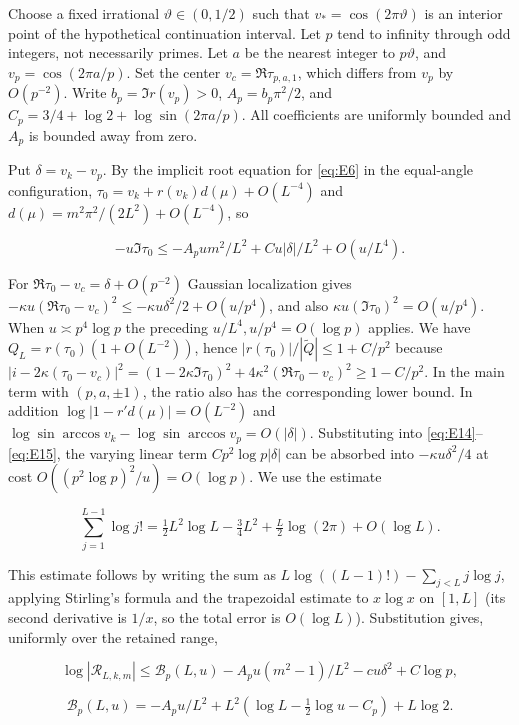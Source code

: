 \documentclass[11pt,a4paper]{article}
\numberwithin{equation}{section}
\theoremstyle{plain}
\theoremstyle{definition}
\begin{document}
Choose a fixed irrational \(\vartheta\in(0,1/2)\) such that \(v_*=\cos(2\pi\vartheta)\) is an interior point of the hypothetical continuation interval. Let \(p\) tend to infinity through odd integers, not necessarily primes. Let \(a\) be the nearest integer to \(p\vartheta\), and \(v_p=\cos(2\pi a/p)\). Set the center \(v_c=\Re\tau_{p,a,1}\), which differs from \(v_p\) by \(O(p^{-2})\). Write \(b_p=\Im r(v_p)>0\), \(A_p=b_p\pi^2/2\), and \(C_p=3/4+\log2+\log\sin(2\pi a/p)\). All coefficients are uniformly bounded and \(A_p\) is bounded away from zero.

Put \(\delta=v_k-v_p\). By the implicit root equation for \eqref{eq:E6} in the equal-angle configuration, \(\tau_0=v_k+r(v_k)d(\mu)+O(L^{-4})\) and \(d(\mu)=m^2\pi^2/(2L^2)+O(L^{-4})\), so

\[-u\Im\tau_0\le- A_p u m^2/L^2+C u|\delta|/L^2+O(u/L^4).\]

For \(\Re\tau_0-v_c=\delta+O(p^{-2})\) Gaussian localization gives \(-\kappa u(\Re\tau_0-v_c)^2\le-\kappa u\delta^2/2+O(u/p^4)\), and also \(\kappa u(\Im\tau_0)^2=O(u/p^4)\). When \(u\asymp p^4\log p\) the preceding \(u/L^4,u/p^4=O(\log p)\) applies. We have \(Q_L=r(\tau_0)(1+O(L^{-2}))\), hence \(|r(\tau_0)|/|\widetilde Q|\le1+C/p^2\) because \(|i-2\kappa(\tau_0-v_c)|^2=(1-2\kappa\Im\tau_0)^2+4\kappa^2(\Re\tau_0-v_c)^2\ge1-C/p^2\). In the main term with \((p,a,\pm1)\), the ratio also has the corresponding lower bound. In addition \(\log|1-r'd(\mu)|=O(L^{-2})\) and \(\log\sin\arccos v_k-\log\sin\arccos v_p=O(|\delta|)\). Substituting into \eqref{eq:E14}--\eqref{eq:E15}, the varying linear term \(C p^2\log p|\delta|\) can be absorbed into \(-\kappa u\delta^2/4\) at cost \(O((p^2\log p)^2/u)=O(\log p)\). We use the estimate

\[\sum_{j=1}^{L-1}\log j!=\tfrac12 L^2\log L-\tfrac34L^2+\tfrac L2\log(2\pi)+O(\log L).\]

This estimate follows by writing the sum as $L\log((L-1)!)-\sum_{j<L}j\log j$, applying Stirling's formula and the trapezoidal estimate to $x\log x$ on $[1,L]$ (its second derivative is $1/x$, so the total error is $O(\log L)$). Substitution gives, uniformly over the retained range,

\begin{equation}
\log|\mathcal R_{L,k,m}|\le \mathcal B_p(L,u)-A_pu(m^2-1)/L^2-c u\delta^2+C\log p,
\label{eq:E16}
\end{equation}

\[\mathcal B_p(L,u)=-A_p u/L^2+L^2(\log L-\tfrac12\log u-C_p)+L\log2.\]
\end{document}
